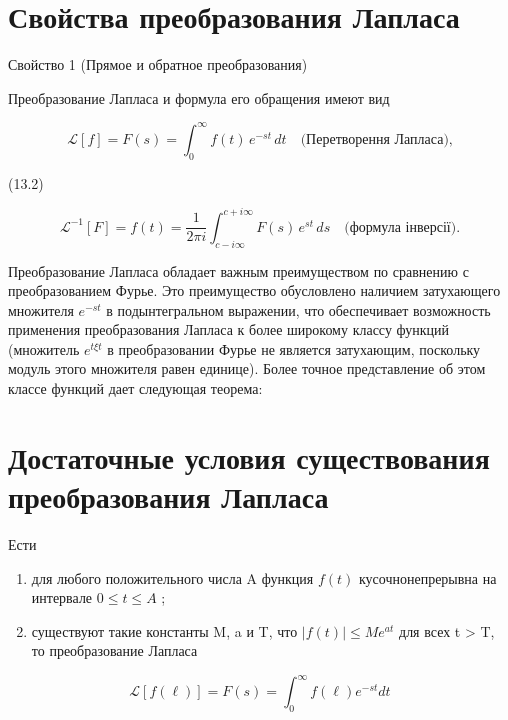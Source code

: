 \documentclass[
  ukrainian,
]{article}
\begin{document}
\section{Свойства преобразования
Лапласа}\label{ux441ux432ux43eux439ux441ux442ux432ux430-ux43fux440ux435ux43eux431ux440ux430ux437ux43eux432ux430ux43dux438ux44f-ux43bux430ux43fux43bux430ux441ux430}

Свойство 1 (Прямое и обратное преобразования)

Преобразование Лапласа и формула его обращения имеют вид

\[
\mathscr{L}[f] = F(s) = \int_{0}^{\infty} f(t) \, e^{-st} \, dt \quad \text{(Перетворення Лапласа),}
\]

(13.2)

\[
\mathscr{L}^{-1}[F] = f(t) = \frac{1}{2\pi i} \int_{c-i\infty}^{c+i\infty} F(s) \, e^{st} \, ds \quad \text{(формула інверсії).}
\]

Преобразование Лапласа обладает важным преимуществом по сравнению с
преобразованием Фурье. Это преимущество обусловлено наличием затухающего
множителя \(e^{-st}\) в подынтегральном выражении, что обеспечивает
возможность применения преобразования Лапласа к более широкому классу
функций (множитель \(e^{t\xi t}\) в преобразовании Фурье не является
затухающим, поскольку модуль этого множителя равен единице). Более
точное представление об этом классе функций дает следующая теорема:

\section{Достаточные условия существования преобразования
Лапласа}\label{ux434ux43eux441ux442ux430ux442ux43eux447ux43dux44bux435-ux443ux441ux43bux43eux432ux438ux44f-ux441ux443ux449ux435ux441ux442ux432ux43eux432ux430ux43dux438ux44f-ux43fux440ux435ux43eux431ux440ux430ux437ux43eux432ux430ux43dux438ux44f-ux43bux430ux43fux43bux430ux441ux430}

Ести

\begin{enumerate}
\def\labelenumi{\arabic{enumi})}
\item
  для любого положительного числа A функция \(f(t)\) кусочнонепрерывна
  на интервале \(0 \le t \le A\) ;
\item
  существуют такие константы M, a и T, что \(|f(t)| \leq Me^{at}\) для
  всех t \textgreater{} T, то преобразование Лапласа
\end{enumerate}

\[
\mathscr{L}[f(\ell)] = F(s) = \int_{0}^{\infty} f(\ell) e^{-st} dt
\]
\end{document}
